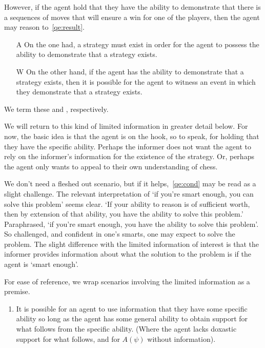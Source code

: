 \begin{note}
  However, if the agent hold that they have the ability to demonstrate that there is a sequences of moves that will ensure a win for one of the players, then the agent may reason to~\ref{qe:result}.

  \begin{enumerate}
  \item[\textsf{A}]\label{A:s} On the one had, a strategy must exist in order for the agent to possess the ability to demonstrate that a strategy exists.
  \item[\textsf{W}]\label{W:s} On the other hand, if the agent has the ability to demonstrate that a strategy exists, then it is possible for the agent to witness an event in which they demonstrate that a strategy exists.
  \end{enumerate}
  We term these \AR{} and \WR{}, respectively.

  We will return to this kind of limited information in greater detail below.
  For now, the basic idea is that the agent is on the hook, so to speak, for holding that they have the specific ability.
  Perhaps the informer does not want the agent to rely on the informer's information for the existence of the strategy.
  Or, perhaps the agent only wants to appeal to their own understanding of chess.

  We don't need a fleshed out scenario, but if it helps,~\ref{qe:cond} may be read as a slight challenge.
  The relevant interpretation of `if you're smart enough, you can solve this problem' seems clear.
  `If your ability to reason is of sufficient worth, then by extension of that ability, you have the ability to solve this problem.'
  Paraphrased, `if you're smart enough, you have the ability to solve this problem'.
  So challenged, and confident in one's smarts, one may expect to solve the problem.
  The slight difference with the limited information of interest is that the informer provides information about what the solution to the problem is if the agent is `smart enough'.
\end{note}

\begin{note}
  For ease of reference, we wrap scenarios involving the limited information as a premise.
  \begin{enumerate}[label=\eA{}, ref=\eA{}]
  \item\label{prem:ab} It is possible for an agent to use information that they have some specific ability so long as the agent has some general ability to obtain support for what follows from the specific ability.
    (Where the agent lacks doxastic support for what follows, and for \(A(\psi)\) without information).
  \end{enumerate}
\end{note}

